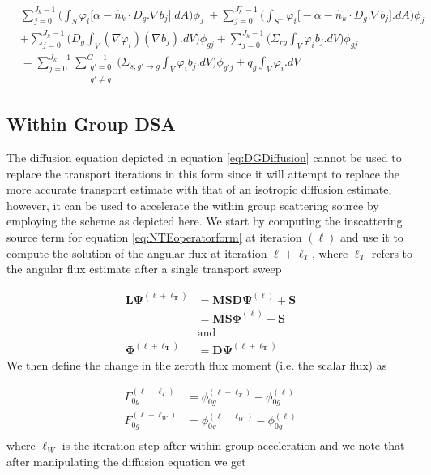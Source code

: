 \documentclass[11pt,letterpaper,titlepage]{article}
\numberwithin{equation}{section}
\newcommand{\beq}{\begin{equation*}
\begin{aligned}}
\newcommand{\eeq}{\end{aligned}
\end{equation*}}
\newcommand{\beqn}{\begin{equation}
	\begin{aligned}}
\newcommand{\eeqn}{\end{aligned}
	\end{equation}}
\begin{document}
\beqn \label{eq:DGDiffusion}
&\sum_{j=0}^{J_k -1} 
\biggr(
 \int_{S} \varphi_i \biggr[
 \alpha - \hat{n}_k\cdot D_g.\nabla b_j
\biggr] .dA 
\biggr) \phi_j^-
+
\sum_{j=0}^{J_k^- -1} 
\biggr(
 \int_{S^-} \varphi_i \biggr[
 -\alpha - \hat{n}_k\cdot D_g.\nabla b_j
\biggr] .dA 
\biggr) \phi_j\\
&+ \sum_{j=0}^{J_k-1} \biggr( D_g  \int_V ( \nabla \varphi_i ) ( \nabla b_j).dV \biggr) \phi_{gj}
+ \sum_{j=0}^{J_k-1} \biggr( \Sigma_{rg}\int_V \varphi_i b_j.dV \biggr) \phi_{gj} \\
&= 
\sum_{j=0}^{J_k-1} \sum_{\substack{g'=0 \\ g'\ne g}}^{G-1} \biggr( \Sigma_{s,g' \to g}   \int_V \varphi_i b_j.dV \biggr) \phi_{g'j} +q_g\int_V \varphi_i .dV
\eeqn

\newpage
\subsection{Within Group DSA} 
The diffusion equation depicted in equation \ref{eq:DGDiffusion} cannot be used to replace the transport iterations in this form since it will attempt to replace the more accurate transport estimate with that of an isotropic diffusion estimate, however, it can be used to accelerate the within group scattering source by employing the scheme as depicted here. We start by computing the inscattering source term for equation \ref{eq:NTEoperatorform} at iteration $(\ell)$ and use it to compute the solution of the angular flux at iteration $\ell+\ell_{T}$, where $\ell_T$ refers to the angular flux estimate after a single transport sweep

\beq
\mathbf{L \Psi^{(\ell + \ell_T)}} &= \mathbf{MSD\Psi^{(\ell)}} + \mathbf{S} \\
&=\mathbf{MS\Phi^{(\ell)}} + \mathbf{S} \\
&\text{and}\\
\mathbf{\Phi^{(\ell+\ell_T)}} &= \mathbf{D\Psi^{(\ell+\ell_T)} }
\eeq 
\newline
We then define the change in the zeroth flux moment (i.e. the scalar flux) as

\beq
F_{0g}^{(\ell+\ell_T)} &=    \phi_{0g}^{(\ell + \ell_T)} - \phi_{0g}^{(\ell )} \\
F_{0g}^{(\ell+\ell_W)} &=    \phi_{0g}^{(\ell + \ell_W)} - \phi_{0g}^{(\ell )} \\
\eeq 
where $\ell_W$ is the iteration step after within-group acceleration and we note that after manipulating the diffusion equation we get
\end{document}
